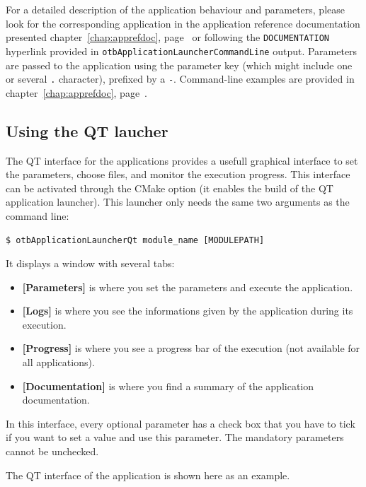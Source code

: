 For a detailed description of the application behaviour and
parameters, please look for the corresponding application in the
application reference documentation presented
chapter~\ref{chap:apprefdoc}, page~\pageref{chap:apprefdoc} or
following the \verb?DOCUMENTATION? hyperlink provided in
\verb?otbApplicationLauncherCommandLine? output. Parameters are passed
to the application using the parameter key (which might include one or
several \verb?.? character), prefixed by a \verb?-?. Command-line
examples are provided in chapter~\ref{chap:apprefdoc},
page~\pageref{chap:apprefdoc}.

\subsection{Using the QT laucher}
The QT interface for the applications provides a usefull graphical interface
to set the parameters, choose files, and monitor the execution progress. 
This interface can be activated through the CMake option  
(it enables the build of the QT application launcher). This launcher 
only needs the same two arguments as the command line:
\begin{verbatim}
$ otbApplicationLauncherQt module_name [MODULEPATH]
\end{verbatim}

It displays a window with several tabs:
\begin{itemize}
\item \textbf{[Parameters]} is where you set the parameters and 
execute the application. 
\item \textbf{[Logs]} is where you see the informations given by 
the application during its execution. 
\item \textbf{[Progress]} is where you see a progress bar of the 
execution (not available for all applications). 
\item \textbf{[Documentation]} is where you find a summary of the 
application documentation.
\end{itemize}

In this interface, every optional parameter has a check box that
you have to tick if you want to set a value and use this parameter.
The mandatory parameters cannot be unchecked.
 
The QT interface of the application  is shown 
here as an example.

